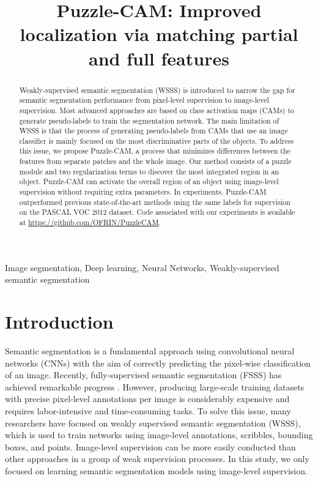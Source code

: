 \documentclass{article}
\title{Puzzle-CAM: Improved localization via matching partial and full features}
\begin{document}
\maketitle


\begin{abstract}








Weakly-supervised semantic segmentation (WSSS) is introduced to narrow the gap for semantic segmentation performance from pixel-level supervision to image-level supervision.
Most advanced approaches are based on class activation maps (CAMs) to generate pseudo-labels to train the segmentation network.
The main limitation of WSSS is that the process of generating pseudo-labels from CAMs that use an image classifier is mainly focused on the most discriminative parts of the objects.
To address this issue, we propose Puzzle-CAM, a process that minimizes differences between the features from separate patches and the whole image.
Our method consists of a puzzle module and two regularization terms to discover the most integrated region in an object.
Puzzle-CAM can activate the overall region of an object using image-level supervision without requiring extra parameters.
In experiments, Puzzle-CAM outperformed previous state-of-the-art methods using the same labels for supervision on the PASCAL VOC 2012 dataset.
Code associated with our experiments is available at \url{https://github.com/OFRIN/PuzzleCAM}.

\end{abstract}
\begin{keywords}
Image segmentation,  Deep learning, Neural Networks, Weakly-supervised semantic segmentation
\end{keywords}





\section{Introduction}
\label{sec:intro}



Semantic segmentation is a fundamental approach using convolutional neural networks (CNNs) with the aim of correctly predicting the pixel-wise classification of an image.
Recently, fully-supervised semantic segmentation (FSSS) has achieved remarkable progress \cite{chen2018encoder, long2015fully, chen2014semantic}.
However, producing large-scale training datasets with precise pixel-level annotations per image is considerably expensive and requires labor-intensive and time-consuming tasks.
To solve this issue, many researchers have focused on weakly supervised semantic segmentation (WSSS), which is used to train networks using image-level annotations, scribbles, bounding boxes, and points.
Image-level supervision can be more easily conducted than other approaches in a group of weak supervision processes.
In this study, we only focused on learning semantic segmentation models using image-level supervision.
\end{document}
